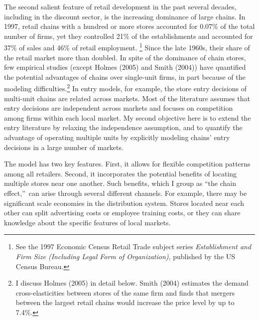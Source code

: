 \documentclass[notitlepage,onecolumn,11pt]{article}
\begin{document}
The second salient feature of retail development in the past several
decades, including in the discount sector, is the increasing dominance of
large chains. In 1997, retail chains with a hundred or more stores accounted
for 0.07\% of the total number of firms, yet they controlled 21\% of the
establishments and accounted for 37\% of sales and 46\% of retail employment.%
\footnote{%
See the 1997 Economic Census Retail Trade subject series \textit{%
Establishment and Firm Size (Including Legal Form of Organization)},
published by the US Census Bureau.} Since the late 1960s, their share of the
retail market more than doubled. In spite of the dominance of chain stores,
few empirical studies (except Holmes (2005) and Smith (2004)) have
quantified the potential advantages of chains over single-unit firms, in
part because of the modeling difficulties.\footnote{%
I discuss Holmes (2005) in detail below. Smith (2004) estimates the demand
cross-elasticities between stores of the same firm and finds that mergers
between the largest retail chains would increase the price level by up to
7.4\%.} In entry models, for example, the store entry decisions of
multi-unit chains are related across markets. Most of the literature assumes
that entry decisions are independent across markets and focuses on
competition among firms within each local market. My second objective here
is to extend the entry literature by relaxing the independence assumption,
and to quantify the advantage of operating multiple units by explicitly
modeling chains' entry decisions in a large number of markets.

The model has two key features. First, it allows for flexible competition
patterns among all retailers. Second, it incorporates the potential benefits
of locating multiple stores near one another. Such benefits, which I group
as \textquotedblleft the chain effect,\textquotedblright\ can arise through
several different channels. For example, there may be significant scale
economies in the distribution system. Stores located near each other can
split advertising costs or employee training costs, or they can share
knowledge about the specific features of local markets.
\end{document}
